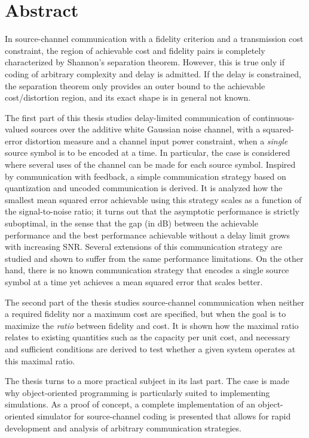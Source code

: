 \chapter*{Abstract}


In source-channel communication with a fidelity criterion and a transmission
cost constraint, the region of achievable cost and fidelity pairs is completely
characterized by Shannon's separation theorem. However, this is true only if
coding of arbitrary complexity and delay is admitted. If the delay is
constrained, the separation theorem only provides an outer bound to the
achievable cost/distortion region, and its exact shape is in general not known.

The first part of this thesis studies delay-limited communication of
continuous-valued sources over the additive white Gaussian noise channel, with a
squared-error distortion measure and a channel input power constraint, when a
\emph{single} source symbol is to be encoded at a time. In particular, the case
is considered where several uses of the channel can be made for each source
symbol. Inspired by communication with feedback, a simple communication strategy
based on quantization and uncoded communication is derived.  It is analyzed how
the smallest mean squared error achievable using this strategy scales as a
function of the signal-to-noise ratio; it turns out that the asymptotic
performance is strictly suboptimal, in the sense that the gap (in dB) between
the achievable performance and the best performance achievable without a delay
limit grows with increasing SNR. Several extensions of this communication
strategy are studied and shown to suffer from the same performance
limitations. On the other hand, there is no known communication strategy that
encodes a single source symbol at a time yet achieves a mean squared error that
scales better. 

The second part of the thesis studies source-channel communication when neither
a required fidelity nor a maximum cost are specified, but when the goal is to
maximize the \emph{ratio} between fidelity and cost. It is shown how the maximal
ratio relates to existing quantities such as the capacity per unit cost, and
necessary and sufficient conditions are derived to test whether a given system
operates at this maximal ratio. 

The thesis turns to a more practical subject in its last part. The case is made
why object-oriented programming is particularly suited to implementing
simulations. As a proof of concept, a complete implementation of an
object-oriented simulator for source-channel coding is presented that allows for
rapid development and analysis of arbitrary communication strategies.
